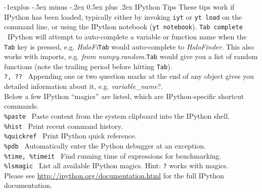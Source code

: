 \documentclass[10pt,landscape]{article}
\makeatletter
\renewcommand{\subsection}{\@startsection{subsection}{2}{0mm}%
                                {-1explus -.5ex minus -.2ex}%
                                {0.5ex plus .2ex}%
                                {\normalfont\normalsize\bfseries}}
\makeatother
\begin{document}
\begin{multicols}{3}
\subsection{IPython Tips}
These tips work if IPython has been loaded, typically either by invoking
\texttt{iyt} or \texttt{yt load} on the command line, or using the IPython notebook (\texttt{yt notebook}).
\texttt{Tab complete} \textemdash\ IPython will attempt to auto-complete a
variable or function name when the \texttt{Tab} key is pressed, e.g. {\it HaloFi}\textendash\texttt{Tab} would auto-complete
to {\it HaloFinder}. This also works with imports, e.g. {\it from numpy.random.}\textendash\texttt{Tab}
would give you a list of random functions (note the trailing period before hitting \texttt{Tab}).\\
\texttt{?, ??} \textemdash\ Appending one or two question marks at the end of any object gives you
detailed information about it, e.g. {\it variable\_name}?.\\
Below a few IPython ``magics'' are listed, which are IPython-specific shortcut commands.\\
\texttt{\%paste} \textemdash\ Paste content from the system clipboard into the IPython shell.\\
\texttt{\%hist} \textemdash\ Print recent command history.\\
\texttt{\%quickref} \textemdash\ Print IPython quick reference.\\
\texttt{\%pdb} \textemdash\ Automatically enter the Python debugger at an exception.\\
\texttt{\%time, \%timeit} \textemdash\ Find running time of expressions for benchmarking.\\
\texttt{\%lsmagic} \textemdash\ List all available IPython magics. Hint: \texttt{?} works with magics.\\


Please see \url{http://ipython.org/documentation.html} for the full
IPython documentation.


\end{multicols}
\end{document}
